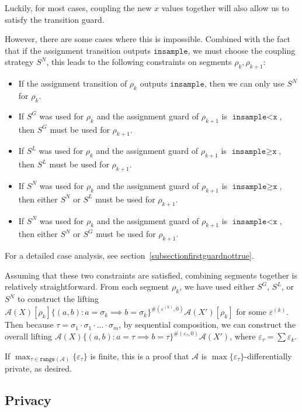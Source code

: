 \documentclass[12pt]{article}
\newcommand{\gguard}[1][x]{\texttt{insample}\geq \texttt{#1}}
\newcommand{\lguard}[1][x]{\texttt{insample} < \texttt{#1}}
\newcommand{\range}{\texttt{range}}
\theoremstyle{definition}
\begin{document}
Luckily, for most cases, coupling the new $x$ values together will also allow us to satisfy the transition guard. 

However, there are some cases where this is impossible. Combined with the fact that if the assignment transition outputs $\texttt{insample}$, we must choose the coupling strategy $S^N$, this leads to the following constraints on segments $\rho_k, \rho_{k+1}$: 

\begin{itemize}
	\item If the assignment transition of $\rho_k$ outputs $\texttt{insample}$, then we can only use $S^N$ for $\rho_k$. 
	\item If $S^G$ was used for $\rho_k$ and the assignment guard of $\rho_{k+1}$ is $\lguard$, then $S^G$ must be used for $\rho_{k+1}$.
	\item If $S^L$ was used for $\rho_k$ and the assignment guard of $\rho_{k+1}$ is $\gguard$, then $S^L$ must be used for $\rho_{k+1}$.
	\item If $S^N$ was used for $\rho_k$ and the assignment guard of $\rho_{k+1}$ is $\gguard$, then either $S^N$ or $S^L$ must be used for $\rho_{k+1}$.
	\item If $S^N$ was used for $\rho_k$ and the assignment guard of $\rho_{k+1}$ is $\lguard$, then either $S^N$ or $S^G$ must be used for $\rho_{k+1}$.
\end{itemize}

For a detailed case analysis, see section\ \ref{subsectionfirstguardnottrue}.

Assuming that these two constraints are satisfied, combining segments together is relatively straightforward. From each segment $\rho_k$, we have used either $S^G$, $S^L$, or $S^N$ to construct the lifting $\mathcal{A}(X)[\rho_k]\{(a, b): a = \sigma_k \implies b = \sigma_k\}^{\#(\varepsilon^{(k)}, 0)}\mathcal{A}(X')[\rho_k]$ for some $\varepsilon^{(k)}$.
Then because $\tau = \sigma_1\cdot\sigma_1\cdot\ldots\cdot\sigma_m$, by sequential composition, we can construct the overall lifting $\mathcal{A}(X)\{(a, b): a = \tau \implies b = \tau\}^{\#(\varepsilon_\tau, 0)}\mathcal{A}(X')$, where $\varepsilon_\tau = \sum\varepsilon_k$. 

If $\max_{\tau\in \range(\mathcal{A})}\{\varepsilon_\tau\}$ is finite, this is a proof that $\mathcal{A}$ is $\max\{\varepsilon_\tau\}$-differentially private, as desired.

\subsection{Privacy}
\end{document}
